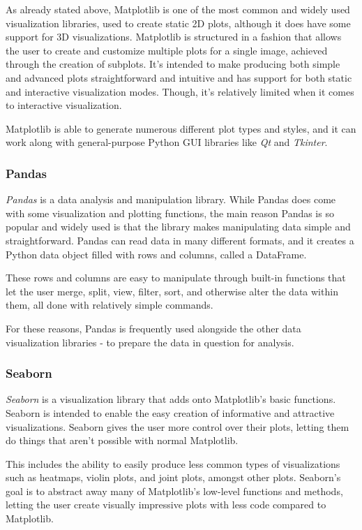 \documentclass[11pt]{article}
\begin{document}
As already stated above, Matplotlib is one of the most common and widely
used visualization libraries, used to create static 2D plots, although
it does have some support for 3D visualizations. Matplotlib is
structured in a fashion that allows the user to create and customize
multiple plots for a single image, achieved through the creation of
subplots. It's intended to make producing both simple and advanced plots
straightforward and intuitive and has support for both static and
interactive visualization modes. Though, it's relatively limited when it
comes to interactive visualization.

Matplotlib is able to generate numerous different plot types and styles,
and it can work along with general-purpose Python GUI libraries like
\emph{Qt} and \emph{Tkinter}.

\subsubsection{Pandas}\label{pandas}

\emph{Pandas} is a data analysis and manipulation library. While Pandas
does come with some visualization and plotting functions, the main
reason Pandas is so popular and widely used is that the library makes
manipulating data simple and straightforward. Pandas can read data in
many different formats, and it creates a Python data object filled with
rows and columns, called a DataFrame.

These rows and columns are easy to manipulate through built-in functions
that let the user merge, split, view, filter, sort, and otherwise alter
the data within them, all done with relatively simple commands.

For these reasons, Pandas is frequently used alongside the other data
visualization libraries - to prepare the data in question for analysis.

\subsubsection{Seaborn}\label{seaborn}

\emph{Seaborn} is a visualization library that adds onto Matplotlib's
basic functions. Seaborn is intended to enable the easy creation of
informative and attractive visualizations. Seaborn gives the user more
control over their plots, letting them do things that aren't possible
with normal Matplotlib.

This includes the ability to easily produce less common types of
visualizations such as heatmaps, violin plots, and joint plots, amongst
other plots. Seaborn's goal is to abstract away many of Matplotlib's
low-level functions and methods, letting the user create visually
impressive plots with less code compared to Matplotlib.
\end{document}
